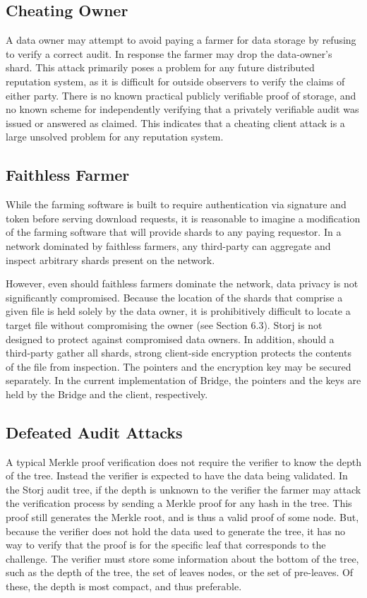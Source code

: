 \documentclass[a4paper,10pt]{article}
\begin{document}
\subsection{Cheating Owner}
A data owner may attempt to avoid paying a farmer for data storage by refusing to verify a correct audit. In response the farmer may drop the data-owner’s shard. This attack primarily poses a problem for any future distributed reputation system, as it is difficult for outside observers to verify the claims of either party. There is no known practical publicly verifiable proof of storage, and no known scheme for independently verifying that a privately verifiable audit was issued or answered as claimed. This indicates that a cheating client attack is a large unsolved problem for any reputation system.

\subsection{Faithless Farmer}
While the farming software is built to require authentication via signature and token before serving download requests, it is reasonable to imagine a modification of the farming software that will provide shards to any paying requestor. In a network dominated by faithless farmers, any third-party can aggregate and inspect arbitrary shards present on the network.

However, even should faithless farmers dominate the network, data privacy is not significantly compromised. Because the location of the shards that comprise a given file is held solely by the data owner, it is prohibitively difficult to locate a target file without compromising the owner (see Section 6.3). Storj is not designed to protect against compromised data owners. In addition, should a third-party gather all shards, strong client-side encryption protects the contents of the file from inspection. The pointers and the encryption key may be secured separately. In the current implementation of Bridge, the pointers and the keys are held by the Bridge and the client, respectively.

\subsection{Defeated Audit Attacks}
A typical Merkle proof verification does not require the verifier to know the depth of the tree. Instead the verifier is expected to have the data being validated. In the Storj audit tree, if the depth is unknown to the verifier the farmer may attack the verification process by sending a Merkle proof for any hash in the tree. This proof still generates the Merkle root, and is thus a valid proof of some node. But, because the verifier does not hold the data used to generate the tree, it has no way to verify that the proof is for the specific leaf that corresponds to the challenge. The verifier must store some information about the bottom of the tree, such as the depth of the tree, the set of leaves nodes, or the set of pre-leaves. Of these, the depth is most compact, and thus preferable.
\end{document}
